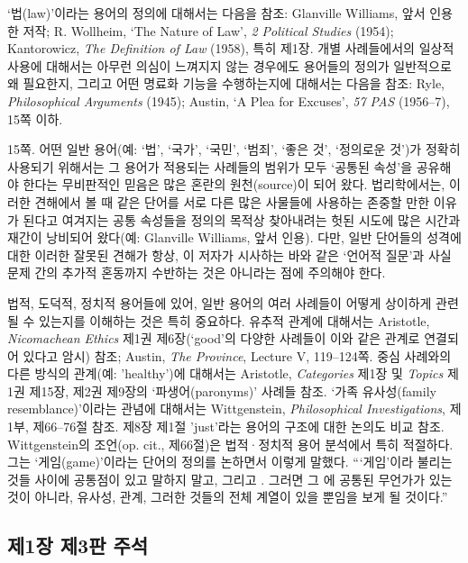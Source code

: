 {‘법(law)’이라는 용어의 정의에 대해서는 다음을 참조: Glanville Williams,
앞서 인용한 저작; R. Wollheim, `The Nature of Law', \emph{2 Political
Studies} (1954); Kantorowicz, \emph{The Definition of Law} (1958), 특히
제1장. 개별 사례들에서의 일상적 사용에 대해서는 아무런 의심이 느껴지지
않는 경우에도 용어들의 정의가 일반적으로 왜 필요한지, 그리고 어떤 명료화
기능을 수행하는지에 대해서는 다음을 참조: Ryle, \emph{Philosophical
Arguments} (1945); Austin, `A Plea for Excuses', \emph{57 PAS}
(1956--7), 15쪽 이하.

\noteentry 15쪽.  어떤 일반 용어(예: ‘법’, ‘국가’, ‘국민’, ‘범죄’, ‘좋은 것’, ‘정의로운
것’)가 정확히 사용되기 위해서는 그 용어가 적용되는 사례들의 범위가 모두
‘공통된 속성’을 공유해야 한다는 무비판적인 믿음은 많은 혼란의
원천(source)이 되어 왔다. 법리학에서는, 이러한 견해에서 볼 때 같은
단어를 서로 다른 많은 사물들에 사용하는  존중할 만한
이유가 된다고 여겨지는 공통 속성들을 정의의 목적상 찾아내려는 헛된
시도에 많은 시간과 재간이 낭비되어 왔다(예: Glanville Williams, 앞서
인용). 다만, 일반 단어들의 성격에 대한 이러한 잘못된 견해가 항상, 이
저자가 시사하는 바와 같은 ‘언어적 질문’과 사실 문제 간의 추가적 혼동까지
수반하는 것은 아니라는 점에 주의해야 한다.

법적, 도덕적, 정치적 용어들에 있어, 일반 용어의 여러 사례들이 어떻게
상이하게 관련될 수 있는지를 이해하는 것은 특히 중요하다. 유추적 관계에
대해서는 Aristotle, \emph{Nicomachean Ethics} 제1권 제6장(`good'의
다양한 사례들이 이와 같은 관계로 연결되어 있다고 암시) 참조; Austin,
\emph{The Province}, Lecture V, 119--124쪽. 중심 사례와의 다른 방식의
관계(예: 'healthy')에 대해서는 Aristotle, \emph{Categories} 제1장 및
\emph{Topics} 제1권 제15장, 제2권 제9장의 ‘파생어(paronyms)’ 사례들
참조. ‘가족 유사성(family resemblance)’이라는 관념에 대해서는
Wittgenstein, \emph{Philosophical Investigations}, 제1부, 제66--76절
참조. 제8장 제1절 'just'라는 용어의 구조에 대한 논의도 비교 참조.
Wittgenstein의 조언(op. cit., 제66절)은 법적·정치적 용어 분석에서 특히
적절하다. 그는 ‘게임(game)’이라는 단어의 정의를 논하면서 이렇게 말했다.
“‘게임’이라 불리는 것들 사이에  공통점이 있고 말하지 말고,  그리고
. 그러면 그 에 공통된 무언가가
있는 것이 아니라, 유사성, 관계, 그러한 것들의 전체 계열이 있을 뿐임을
보게 될 것이다.”

\subsection{제1장 제3판
주석}\label{uxc81c1uxc7a5-uxc81c3uxd310-uxc8fcuxc11d}

}
